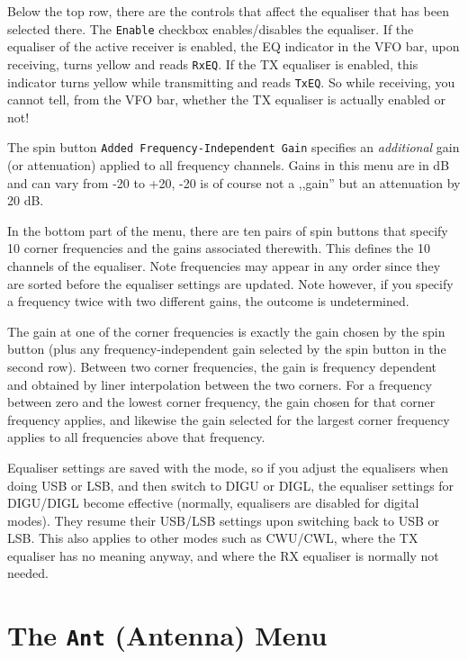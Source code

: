 \documentclass[12pt]{book}
\def\rett#1{\texttt{\color{red}#1}}
\begin{document}
Below the  top row, there are the controls that affect the equaliser
that has been selected there.
The \rett{Enable} checkbox enables/disables the equaliser.
If the equaliser of the active receiver
is enabled, the EQ indicator in the
VFO bar, upon receiving, turns yellow and reads \rett{RxEQ}.
If the TX equaliser is enabled, this indicator turns yellow
while transmitting and reads \rett{TxEQ}. So while receiving,
you cannot tell, from the VFO bar, whether the TX equaliser is
actually enabled or not!

The spin button \rett{Added Frequency-Independent Gain} specifies
an \textit{additional} gain (or attenuation) applied to all frequency
channels. Gains in this menu are in dB and can vary from -20 to +20,
-20 is of course  not a ,,gain'' but an attenuation by 20 dB.

In the bottom part of the menu, there are ten pairs of spin buttons
that specify 10 corner frequencies and the gains associated therewith.
This defines the 10 channels
of the equaliser. Note frequencies may appear in any order since they
are sorted before the equaliser settings are updated. Note however,
if you specify a frequency twice with two different gains, the outcome
is undetermined.

The gain at one of the   corner frequencies is exactly the gain
chosen by the spin button (plus any frequency-independent gain
selected by the spin button in the second row). Between two
corner frequencies, the gain is frequency dependent and obtained
by liner interpolation between the two corners. For a frequency
between  zero and the lowest corner frequency, the gain chosen for that corner
frequency applies, and likewise the gain selected for the largest corner frequency
applies to all frequencies above that frequency.

Equaliser settings are saved with the mode, so
if you adjust the equalisers when doing USB or LSB, and then switch to
DIGU or DIGL, the equaliser settings for DIGU/DIGL become effective
(normally, equalisers are disabled for digital modes).
They resume their USB/LSB
settings upon switching back to USB or LSB. This also applies to other
modes such as CWU/CWL, where the TX equaliser has no meaning
anyway, and where the RX equaliser is normally not needed.

\section{The \texttt{Ant} (Antenna) Menu}
\end{document}
